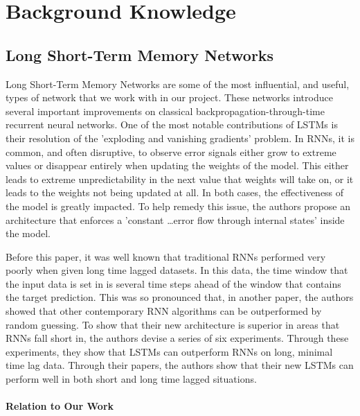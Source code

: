 \documentclass{article}
\begin{document}
    \section{Background Knowledge}

    \subsection{Long Short-Term Memory Networks}

    Long Short-Term Memory Networks\cite{LSTM} are some of the most influential, and useful, types of network that we work
    with in our project.  These networks introduce several important improvements on classical backpropagation-through-time
    recurrent neural networks.  One of the most notable contributions of LSTMs is their resolution of the 'exploding
    and vanishing gradients' problem.  In RNNs, it is common, and often disruptive, to observe error signals either
    grow to extreme values or disappear entirely when updating the weights of the model.  This either leads to
    extreme unpredictability in the next value that weights will take on, or it leads to the weights not being
    updated at all. In both cases, the effectiveness of the model is greatly impacted.  To help remedy this issue,
    the authors propose an architecture that enforces a 'constant \ldots error flow through internal states' inside the
    model.

    Before this paper, it was well known that traditional RNNs performed very poorly when given long time lagged
    datasets.   In this data, the time window that the input data is set in is several time steps ahead of the window
    that contains the target prediction.  This was so pronounced that, in another paper\cite{weightGuessing}, the authors
    showed that other contemporary RNN algorithms can be outperformed by random guessing.  To show that their new
    architecture is superior in areas that RNNs fall short in, the authors devise a series of six experiments.
    Through these experiments, they show that LSTMs can outperform RNNs on long, minimal time lag data.  Through their
    papers, the authors show that their new LSTMs can perform well in both short and long time lagged situations.

    \paragraph{Relation to Our Work}
\end{document}

